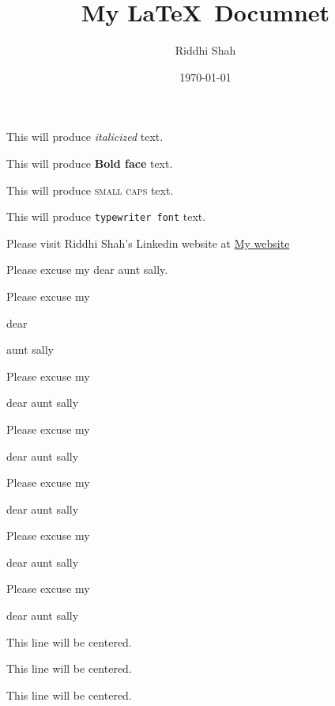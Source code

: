 \documentclass[12pt]{article}
\title{My \LaTeX\ Documnet}
\author{Riddhi Shah}
\date{\today}
\begin{document}
\maketitle
\tableofcontents
\vspace{1cm}

This will produce \textit{italicized} text.

This will produce \textbf{Bold face} text. 

This will produce \textsc{small caps} text. 

This will produce \texttt{typewriter font} text.

Please visit Riddhi Shah's Linkedin website at \href{https://www.linkedin.com/in/riddhishah65/}{My website}

\vspace{1cm}

Please excuse my dear aunt sally.

Please excuse my \begin{Large}dear\end{Large} aunt sally

Please excuse my \begin{Large}dear aunt sally   
\end{Large}

Please excuse my \begin{Huge}dear aunt sally   
\end{Huge}

Please excuse my \begin{small}dear aunt sally   
\end{small}

Please excuse my \begin{scriptsize}dear aunt sally   
\end{scriptsize}

Please excuse my \begin{tiny}dear aunt sally   
\end{tiny}

\begin{center}
    This line will be centered.
    
\end{center}

\begin{flushleft}
    This line will be centered.
    
\end{flushleft}

\begin{flushright}
    This line will be centered.
    
\end{flushright}
\end{document}
